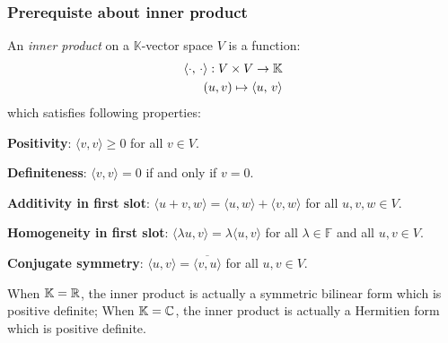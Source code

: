 \documentclass[en,geye,blue,normal,12pt,bibend=bibtex]{elegantnote}
\begin{document}
\subsubsection{Prerequiste about inner product}
\begin{definition}
    An \textit{inner product} on a \(\mathbb{K}\)-vector space \(V\) is a function:
    \begin{align*}
        \left\langle \cdot,\, \cdot \right\rangle: V \times V \to \mathbb{K} \\
        (u,v) \mapsto \left\langle u,\, v \right\rangle
    \end{align*} which satisfies following properties:

\textbf{Positivity}: \(\langle v, v \rangle \geq 0\) for all \( v \in V \).

\textbf{Definiteness}: \(\langle v, v \rangle = 0\) if and only if \( v = 0 \).

\textbf{Additivity in first slot}: \(\langle u + v, w \rangle = \langle u, w \rangle + \langle v, w \rangle\) for all \( u, v, w \in V \).

\textbf{Homogeneity in first slot}: \(\langle \lambda u, v \rangle = \lambda \langle u, v \rangle\) for all \( \lambda \in \mathbb{F} \) and all \( u, v \in V \).

\textbf{Conjugate symmetry}: \(\langle u, v \rangle = \overline{\langle v, u \rangle}\) for all \( u, v \in V \).         
\end{definition}

\begin{remark}
    When \(\mathbb{K} = \mathbb{R}\), the inner product is actually a symmetric bilinear form which is positive definite; When \(\mathbb{K} = \mathbb{C}\), the inner product is actually a Hermitien form which is positive definite.
\end{remark}
\end{document}
